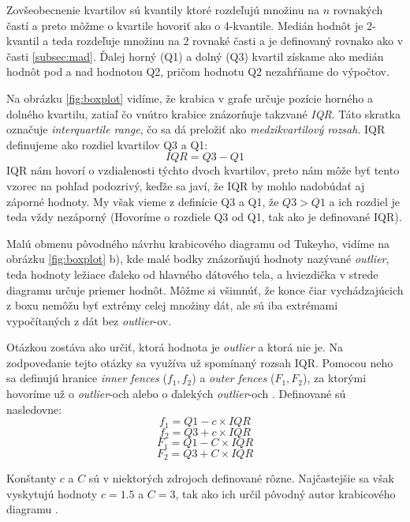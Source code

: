 Zovšeobecnenie kvartilov sú kvantily ktoré rozdeľujú množinu na $n$ rovnakých častí a preto môžme o kvartile hovoriť ako o 4-kvantile. Medián hodnôt je 2-kvantil a teda rozdeľuje množinu na 2 rovnaké časti a je definovaný rovnako ako v časti \ref{subsec:mad}. Ďalej horný (Q1) a dolný (Q3) kvartil získame ako medián hodnôt pod a nad hodnotou Q2, pričom hodnotu Q2 nezahŕňame do výpočtov. 

Na obrázku \ref{fig:boxplot} vidíme, že krabica v grafe určuje pozície horného a dolného kvartilu, zatiaľ čo vnútro krabice znázorňuje takzvané \textit{IQR}. Táto skratka označuje \textit{interquartile range}, čo sa dá preložiť ako \textit{medzikvartilový rozsah}. IQR definujeme ako rozdiel kvartilov Q3 a Q1:
\[
	IQR = Q3 - Q1
\]
IQR nám hovorí o vzdialenosti týchto dvoch kvartilov, preto nám môže byť tento vzorec na pohľad podozrivý, keďže sa javí, že IQR by mohlo nadobúdať aj záporné hodnoty. My však vieme z definície Q3 a Q1, že $ Q3 > Q1 $ a ich rozdiel je teda vždy nezáporný (Hovoríme o rozdiele Q3 od Q1, tak ako je definované IQR).

Malú obmenu pôvodného návrhu krabicového diagramu od Tukeyho, vidíme na obrázku \ref{fig:boxplot} b), kde malé bodky znázorňujú hodnoty nazývané \textit{outlier}, teda hodnoty ležiace ďaleko od hlavného dátového tela, a hviezdička v strede diagramu určuje priemer hodnôt. Môžme si všimnúť, že konce čiar vychádzajúcich z boxu nemôžu byť extrémy celej množiny dát, ale sú iba extrémami vypočítaných z dát bez \textit{outlier}-ov.

Otázkou zostáva ako určiť, ktorá hodnota je \textit{outlier} a ktorá nie je. Na zodpovedanie tejto otázky sa využíva už spomínaný rozsah IQR. Pomocou neho sa definujú hranice \textit{inner fences} ($f_{1}, f_{2}$) a \textit{outer fences} ($F_{1}, F_{2}$), za ktorými hovoríme už o \textit{outlier}-och alebo o ďalekých \textit{outlier}-och \cite{Schwertman}. Definované sú nasledovne:
\\
\[f_{1} = Q1 - c \times IQR\]	
\[f_{2} = Q3 + c \times IQR\]
\[F_{1} = Q1 - C \times IQR\]
\[F_{2} = Q3 + C \times IQR\]

Konštanty $ c $ a $ C $ sú v niektorých zdrojoch definované rôzne. Najčastejšie sa však vyskytujú hodnoty $ c = 1.5 $ a $ C = 3$, tak ako ich určil pôvodný autor krabicového diagramu \cite{Tukey}.

